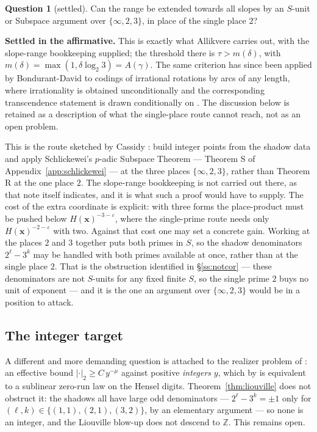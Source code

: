 \documentclass[11pt,reqno]{amsart}
\theoremstyle{plain}
\theoremstyle{definition}
\newtheorem{question}[theorem]{Question}
\newcommand{\Z}{\mathbb{Z}}
\newcommand{\Av}{A(\gamma)}
\begin{document}
\begin{question}[settled]\label{q:subspace}
Can the range be extended towards all slopes by an $S$-unit or Subspace argument over
$\{\infty,2,3\}$, in place of the single place $2$?
\end{question}

\noindent
\textbf{Settled in the affirmative.} This is exactly what Allikvere
\cite[Theorems 5.3 and 5.4]{Allikvere26} carries out, with the slope-range bookkeeping supplied;
the threshold there is $\tau>m(\delta)$, with $m(\delta)=\max(1,\delta\log_2 3)=\Av$. The same
criterion has since been applied by Bondurant-David \cite{BondurantDavid26} to codings of
irrational rotations by arcs of any length, where irrationality is obtained unconditionally and
the corresponding transcendence statement is drawn conditionally on
\cite[Theorem 5.3]{Allikvere26}. The discussion below is retained as a description of
what the single-place route cannot reach, not as an open problem.

\noindent
This is the route sketched by Cassidy \cite[\S4.6]{Cassidy26}: build integer points
from the shadow data and apply Schlickewei's $p$-adic Subspace Theorem --- Theorem S of
Appendix~\ref{app:schlickewei} --- at the three places $\{\infty,2,3\}$, rather than Theorem R at
the one place $2$. The slope-range bookkeeping is not carried out there, as that note itself
indicates, and it is what such a proof would have to supply. The cost of the extra coordinate is
explicit: with three forms the place-product must be pushed below $H(\mathbf{x})^{-3-\varepsilon}$,
where the single-prime route needs only $H(\mathbf{x})^{-2-\varepsilon}$ with two. Against that cost one may set a concrete gain. Working at the places $2$ and $3$ together puts
both primes in $S$, so the shadow denominators $2^{\ell}-3^{k}$ may be handled with both primes
available at once, rather than at the single place $2$. That is the obstruction identified in
\S\ref{ss:notcor} --- these denominators are not $S$-units for any fixed finite $S$, so the single
prime $2$ buys no unit of exponent --- and it is the one an argument over $\{\infty,2,3\}$ would
be in a position to attack.

\subsection{The integer target}\label{ss:integer}
A different and more demanding question is attached to the realizer problem of \cite{DJedge}: an
effective bound $|\cdot|_2\ge C\,y^{-\mu}$ against positive \emph{integers} $y$, which by
\cite[Proposition 7.2]{DJedge} is equivalent to a sublinear zero-run law on the Hensel digits.
Theorem~\ref{thm:liouville} does not obstruct it: the shadows all have large odd denominators ---
$2^{\ell}-3^{k}=\pm1$ only for $(\ell,k)\in\{(1,1),(2,1),(3,2)\}$, by an elementary argument ---
so none is an integer, and the Liouville blow-up does not descend to $\Z$. This remains open.
\end{document}
